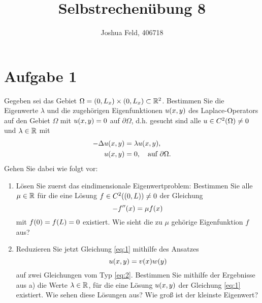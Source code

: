 \documentclass{exercise}
\institute{Applied and Computational Mathematics}
\title{Selbstrechenübung 8}
\author{Joshua Feld, 406718}
\begin{document}
    \maketitle


    \section*{Aufgabe 1}
    
    \begin{problem}
        Gegeben sei das Gebiet \(\Omega = \parentheses*{0, L_x} \times \parentheses*{0, L_x} \subset \R^2\).
        Bestimmen Sie die Eigenwerte \(\lambda\) und die zugehörigen Eigenfunktionen \(u\parentheses*{x, y}\) des Laplace-Operators auf den Gebiet \(\Omega\) mit \(u\parentheses*{x, y} = 0\) auf \(\partial\Omega\), d.h. gesucht sind alle \(u \in C^2\parentheses*{\Omega} \ne 0\) und \(\lambda \in \R\) mit
        \begin{align}
            -\Delta u\parentheses*{x, y} &= \lambda u\parentheses*{x, y},\label{eq:1}\\
            u\parentheses*{x, y} &= 0, \quad \text{auf }\partial\Omega.\nonumber
        \end{align}
        Gehen Sie dabei wie folgt vor:
        \begin{enumerate}
            \item Lösen Sie zuerst das eindimensionale Eigenwertproblem: Bestimmen Sie alle \(\mu \in \R\) für die eine Lösung \(f \in C^2\parentheses*{\parentheses*{0, L}} \ne 0\) der Gleichung
            \begin{equation}\label{eq:2}
                -f''\parentheses*{x} = \mu f\parentheses*{x}
            \end{equation}
            mit \(f\parentheses*{0} = f\parentheses*{L} = 0\) existiert.
            Wie sieht die zu \(\mu\) gehörige Eigenfunktion \(f\) aus?
            \item Reduzieren Sie jetzt Gleichung \eqref{eq:1} mithilfe des Ansatzes
            \[
                u\parentheses*{x, y} = v\parentheses*{x}w\parentheses*{y}
            \]
            auf zwei Gleichungen vom Typ \eqref{eq:2}.
            Bestimmen Sie mithilfe der Ergebnisse aus a) die Werte \(\lambda \in \R\), für die eine Lösung \(u\parentheses*{x, y}\) der Gleichung \eqref{eq:1} existiert.
            Wie sehen diese Lösungen aus?
            Wie groß ist der kleinste Eigenwert?
        \end{enumerate}
    \end{problem}
    
\end{document}
